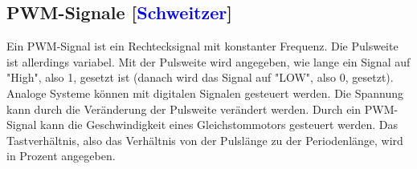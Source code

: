 \documentclass[titlepage,12pt,twoside]{article}
\begin{document}
\subsection{PWM-Signale [\textcolor{blue}{Schweitzer}]}
\label{chap:PWM-Signale}
Ein PWM-Signal ist ein Rechtecksignal mit konstanter Frequenz. Die Pulsweite ist allerdings variabel. Mit der Pulsweite wird angegeben, wie lange ein Signal auf 
"High", also 1, gesetzt ist (danach wird das Signal auf "LOW", also 0, gesetzt). Analoge Systeme können mit digitalen Signalen gesteuert werden. Die Spannung kann 
durch die Veränderung der Pulsweite verändert werden. Durch ein PWM-Signal kann die Geschwindigkeit eines Gleichstommotors gesteuert werden. Das Tastverhältnis, 
also das Verhältnis von der Pulslänge zu der Periodenlänge, wird in Prozent angegeben. \\
\\
\end{document}
